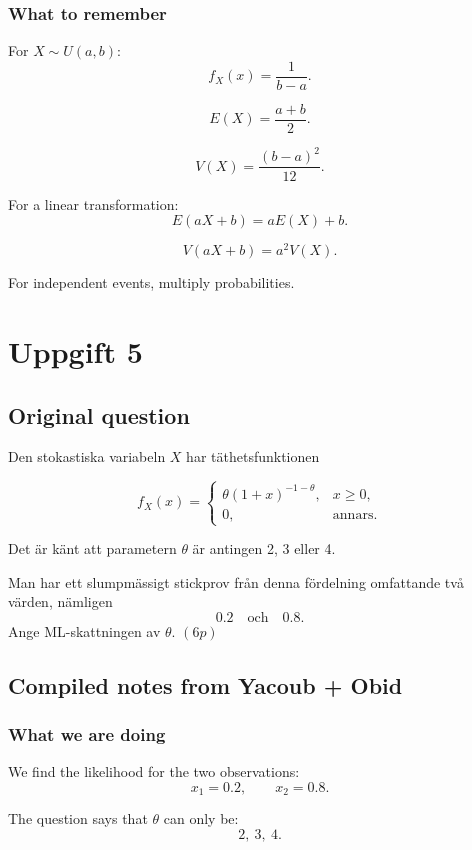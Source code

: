 \documentclass[10pt]{article}
\begin{document}
\subsubsection*{What to remember}

For \(X\sim U(a,b)\):
\[
f_X(x)=\frac{1}{b-a}.
\]

\[
E(X)=\frac{a+b}{2}.
\]

\[
V(X)=\frac{(b-a)^2}{12}.
\]

For a linear transformation:
\[
E(aX+b)=aE(X)+b.
\]

\[
V(aX+b)=a^2V(X).
\]

For independent events, multiply probabilities.

\section*{Uppgift 5}

\subsection*{Original question}

Den stokastiska variabeln \(X\) har täthetsfunktionen

\[
f_X(x)=
\begin{cases}
\theta(1+x)^{-1-\theta},
& x\ge 0,\\
0,
& \text{annars}.
\end{cases}
\]

Det är känt att parametern \(\theta\) är antingen
2, 3 eller 4.

Man har ett slumpmässigt stickprov från denna
fördelning omfattande två värden, nämligen
\[
0.2
\quad\text{och}\quad
0.8.
\]
Ange ML-skattningen av \(\theta\). \((6p)\)

\subsection*{Compiled notes from Yacoub + Obid}

\subsubsection*{What we are doing}

We find the likelihood for the two observations:
\[
x_1=0.2,
\qquad
x_2=0.8.
\]

The question says that \(\theta\) can only be:
\[
2,\ 3,\ 4.
\]
\end{document}
